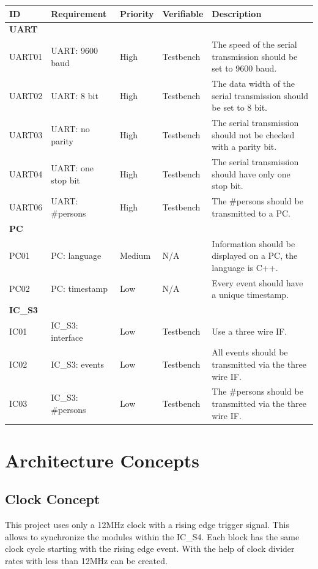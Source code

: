 \documentclass[12pt,a4 paper] {report}
\begin{document}
\begin{center}
	\begin{tabular}{|p{1.5cm}|p{3.5cm}|p{1.5cm}|p{2cm}|p{5.5cm}|}
		\hline
		\textbf{ID} & \textbf{Requirement} & \textbf{Priority} & \textbf{Verifiable} & \textbf{Description} \\
		\hline
		\multicolumn{5}{|l|}{\textbf{UART}} \\
		\hline
		UART01 & UART: 9600 baud & High & Testbench & The speed of the serial transmission should be set to 9600 baud. \\
		\hline
		UART02 & UART: 8 bit & High & Testbench & The data width of the serial transmission should be set to 8 bit. \\
		\hline
		UART03 & UART: no parity & High & Testbench & The serial transmission should not be checked with a parity bit. \\
		\hline
		UART04 & UART: one stop bit & High & Testbench & The serial transmission should have only one stop bit. \\
		\hline
		UART06 & UART: \#persons & High & Testbench & The \#persons should be transmitted to a PC. \\
		\hline
		\multicolumn{5}{|l|}{\textbf{PC}} \\
		\hline	
		PC01 & PC: language & Medium & N/A & Information should be displayed on a PC, the language is C++. \\
		\hline
		PC02 & PC: timestamp & Low & N/A & Every event should have a unique timestamp. \\
		\hline
		\multicolumn{5}{|l|}{\textbf{IC\_S3}} \\
		\hline
		IC01 & IC\_S3: interface & Low & Testbench & Use a three wire IF. \\
		\hline
		IC02 & IC\_S3: events & Low & Testbench & All events should be transmitted via the three wire IF. \\
		\hline
		IC03 & IC\_S3: \#persons & Low & Testbench & The \#persons should be transmitted via the three wire IF. \\
		\hline
	\end{tabular}
\end{center}

\newpage

\chapter{Architecture Concepts}
\section*{Clock Concept}
This project uses only a 12MHz clock with a rising edge trigger signal. This allows to synchronize the modules within the IC\_S4.
Each block has the same clock cycle starting with the rising edge event. With the help of clock divider rates with less than 12MHz can be created.
\end{document}
